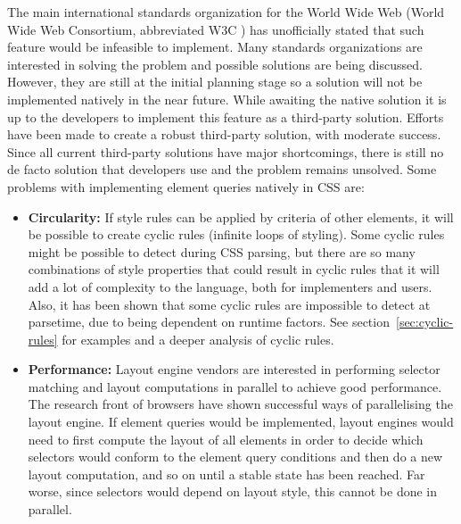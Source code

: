 \documentclass[a4paper,11pt]{kth-mag}
\newcommand\abbr[2][]{\uppercase{#2}\ifthenelse{\equal{#1}{}}%
                     {}{#1}}
\begin{document}
      The main international standards organization for the World Wide Web (World Wide Web Consortium, abbreviated \abbr{w3c}) has unofficially stated that such feature would be infeasible to implement.
      Many standards organizations are interested in solving the problem and possible solutions are being discussed. 
      However, they are still at the initial planning stage so a solution will not be implemented natively in the near future.
      While awaiting the native solution it is up to the developers to implement this feature as a third-party solution.
      Efforts have been made to create a robust third-party solution, with moderate success.
      Since all current third-party solutions have major shortcomings, there is still no de facto solution that developers use and the problem remains unsolved.
      Some problems with implementing element queries natively in \abbr{css} are:
      \begin{itemize}
        \item \textbf{Circularity:}
        If style rules can be applied by criteria of other elements, it will be possible to create cyclic rules (infinite loops of styling).
        Some cyclic rules might be possible to detect during \abbr{css} parsing, but there are so many combinations of style properties that could result in cyclic rules that it will add a lot of complexity to the language, both for implementers and users.
        Also, it has been shown that some cyclic rules are impossible to detect at parsetime, due to being dependent on runtime factors.
        See section~\ref{sec:cyclic-rules} for examples and a deeper analysis of cyclic rules.
        \item \textbf{Performance:} 
        Layout engine vendors are interested in performing selector matching and layout computations in parallel to achieve good performance.
        The research front of browsers have shown successful ways of parallelising the layout engine.
        If element queries would be implemented, layout engines would need to first compute the layout of all elements in order to decide which selectors would conform to the element query conditions and then do a new layout computation, and so on until a stable state has been reached.
        Far worse, since selectors would depend on layout style, this cannot be done in parallel.
      \end{itemize}
\end{document}
